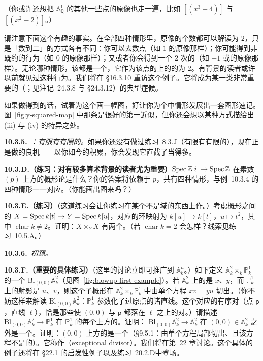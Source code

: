 （你或许还想把 $\mathbb{A}^1_{\mathbb{Q}}$ 的其他一些点的原像也走一遍，比如 $[(x^3-4)]$ 与 $[(x^2-2)]$。）

请注意下面这个有趣的事实。在全部四种情形里，原像的个数都可以解读为 $2$，只是「数到二」的方式各有不同：你可以去数点（如 $1$ 的原像那样）；你可能得到非既约的行为（如 $0$ 的原像那样）；又或者你会得到一个 $2$ 次的\trFieldExtension（如 $-1$ 或\trGenericPoint{}的原像那样）。无论哪种情形，该\trFiber{}都是一个\trAffine\trScheme，它作为该点的\trResidueField{}上的\trVectorSpace{}的\trDimension{}为 $2$。有\trNumberTheory{}背景的读者或许以前就见过这种行为。我们将在 \S16.3.10 重访这个例子。它将成为某一类非常重要的\trMorphism{}（\trFinite\trFlat\trMorphism；见注记~24.3.8 与 \S24.3.12）的典型症候。

如果做得到的话，试着为这个\trMorphism{}画一幅图，好让你为个中情形发展出一套图形速记。图~\ref{fig:y-squared-map} 中那条\trParabola{}是很好的第一近似，但你还会想以某种方式描绘出 (iii) 与 (iv) 的特异之处。

\textbf{10.3.5.}\ \emph{\trhRemark{}：有限\trMorphism{}有有限的\trFiber。}\quad 如果你还没有做过\mbox{练习~8.3.J}（有限\trMorphism{}有有限的\trFiber），现在正是做的良机——以你如今的积累，你会发现它直截了当得多。

\textbf{10.3.D.（练习：对有较多算术背景的读者尤为重要）}\quad $\operatorname{Spec}\mathbb{Z}[i]\to\operatorname{Spec}\mathbb{Z}$ 在素数 $(p)$ 上方的概形论\trFiber{}是什么？你的答案将依赖于 $p$，共有四种情形，与例~10.3.4 的四种情形一一对应。（你能画出图来吗？）

\textbf{10.3.E.（练习）}\quad （这道练习会让你练习在某个不是域的东西上作\trFiberProduct。）考虑概形之间的\trMorphism{} $X=\operatorname{Spec} k[t]\to Y=\operatorname{Spec} k[u]$，对应的环映射为 $k[u]\to k[t]$，$u\mapsto t^2$，其中 $\operatorname{char}k\neq 2$。证明：$X\times_Y X$ 有两个\trIrreducibleComponent。（若 $\operatorname{char}k=2$ 会怎样？线索见\mbox{练习~10.5.A}。）

\textbf{10.3.6.}\ \emph{\trBlowup{}初窥。}

\textbf{10.3.F.（重要的具体练习）}\quad （这里的讨论立即可推广到 $\mathbb{A}^n_k$。）如下定义 $\mathbb{A}^2_k\times_k\mathbb{P}^1_k$ 的一个\trClosedSubscheme{} $\mathrm{Bl}_{(0,0)}\mathbb{A}^2_k$（见图~\ref{fig:blowup-first-example}）。若 $\mathbb{A}^2_k$ 上的\trCoordinate{}是 $x$、$y$，而 $\mathbb{P}^1_k$ 上的射影\trCoordinate{}是 $u$、$v$，则这个子概形在 $\mathbb{A}^2_k\times_k\mathbb{P}^1_k$ 中由单个方程 $xv=yu$ 切出。（你不妨这样来解读 $\mathrm{Bl}_{(0,0)}\mathbb{A}^2_k$：$\mathbb{P}^1_k$ 参数化了过原点的诸直线。这个\trBlowup{}对应的有序对（点 $\mathsf{p}$，直线 $\ell$），恰是那些使 $(0,0)$ 与 $\mathsf{p}$ 都落在 $\ell$ 之上的对。）请描述\trMorphism{} $\mathrm{Bl}_{(0,0)}\mathbb{A}^2_k\to\mathbb{P}^1_k$ 在 $\mathbb{P}^1_k$ 的每个\trClosedPoint{}上方的\trFiber。证明：\trMorphism{} $\mathrm{Bl}_{(0,0)}\mathbb{A}^2_k\to\mathbb{A}^2_k$ 在 $(0,0)\in\mathbb{A}^2_k$ 之外是一个\trIsomorphism。证明：$(0,0)$ 上方的\trFiber{}是一个\trEffectiveCartierDivisor（\S9.5.1：由单个方程局部切出、且该方程不是\trZerodivisor{}的\trClosedSubscheme）。它称作\textbf{\trExceptionalDivisor{}}（exceptional divisor）。我们将在第~22 章讨论\trBlowup。这个具体的例子还将在 \S22.1 的启发性例子以及\mbox{练习~20.2.D}中登场。

